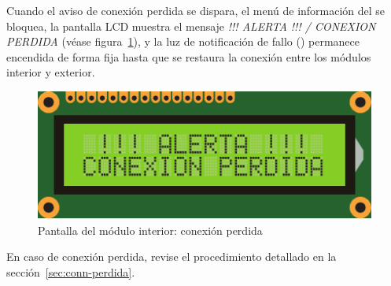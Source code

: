 \begin{descriptioncompact}
Cuando el aviso de conexión perdida se dispara, el menú de información del \MIE se bloquea, la pantalla LCD  muestra el mensaje \emph{!!! ALERTA !!! / CONEXION PERDIDA} (véase figura~\ref{fig:screen-conn-lost}), y la luz de notificación de fallo  () permanece encendida de forma fija hasta que se restaura la conexión entre los módulos interior y exterior. 

\begin{figure}[H]
  \centering
  \includegraphics[width=0.6\columnwidth]{images/screen-conn-lost}
  \caption{Pantalla del módulo interior: conexión perdida}
  \label{fig:screen-conn-lost}
\end{figure}

En caso de conexión perdida, revise el procedimiento detallado en la sección~\ref{sec:conn-perdida}.
\attend

\end{descriptioncompact}


\cleardoublepage

